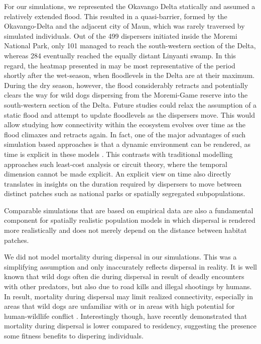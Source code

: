 \documentclass[abstract=on,10pt,a4paper,bibliography=totocnumbered]{article}
\begin{document}
For our simulations, we represented the Okavango Delta statically and assumed a
relatively extended flood. This resulted in a quasi-barrier, formed by the
Okavango-Delta and the adjacent city of Maun, which was rarely traversed by
simulated individuals. Out of the 499 dispersers initiated inside the Moremi
National Park, only 101 managed to reach the south-western section of the Delta,
whereas 284 eventually reached the equally distant Linyanti swamp. In this
regard, the heatmap presented in  may be most representative of
the period shortly after the wet-season, when floodlevels in the Delta are at
their maximum. During the dry season, however, the flood considerably retracts
and potentially clears the way for wild dogs dispersing from the Moremi-Game
reserve into the south-western section of the Delta. Future studies could relax
the assumption of a static flood and attempt to update floodlevels as the
dispersers move. This would allow studying how connectivity within the ecosystem
evolves over time as the flood climaxes and retracts again. In fact, one of the
major advantages of such simulation based approaches is that a dynamic
environment can be rendered, as time is explicit in these models
\citep{Zeller.2020}. This contrasts with traditional modelling approaches such
least-cost analysis or circuit theory, where the temporal dimension cannot be
made explicit. An explicit view on time also directly translates in insights on
the duration required by dispersers to move between distinct patches such as
national parks or spatially segregated subpopulations.

Comparable simulations that are based on empirical data are also a fundamental
component for spatially realistic population models in which dispersal is
rendered more realistically and does not merely depend on the distance between
habitat patches.

We did not model mortality during dispersal in our simulations. This was a
simplifying assumption and only inaccurately reflects dispersal in reality. It
is well known that wild dogs often die during dispersal in result of deadly
encounters with other predators, but also due to road kills and illegal
shootings by humans. In result, mortality during dispersal may limit realized
connectivity, especially in areas that wild dogs are unfamiliar with or in areas
with high potential for human-wildlife conflict \citep{Cozzi.2020}.
Interestingly though, \cite{Behr.2021} have recently demonstrated that mortality
during dispersal is lower compared to residency, suggesting the presence some
fitness benefits to dispering individuals.
\end{document}
